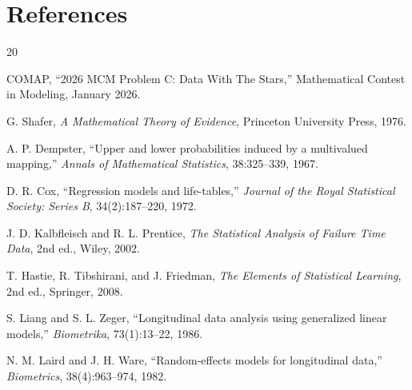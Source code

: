 \documentclass[10pt]{article}
\begin{document}
\section*{References}

\begin{thebibliography}{20}

 COMAP, ``2026 MCM Problem C: Data With The Stars,'' Mathematical
Contest in Modeling, January 2026.

 G. Shafer, \textit{A Mathematical Theory of Evidence}, Princeton
University Press, 1976.

 A. P. Dempster, ``Upper and lower probabilities induced by a
multivalued mapping,'' \textit{Annals of Mathematical Statistics}, 38:325--339, 1967.

 D. R. Cox, ``Regression models and life-tables,'' \textit{Journal of
the Royal Statistical Society: Series B}, 34(2):187--220, 1972.

 J. D. Kalbfleisch and R. L. Prentice, \textit{The Statistical
Analysis of Failure Time Data}, 2nd ed., Wiley, 2002.

 T. Hastie, R. Tibshirani, and J. Friedman, \textit{The Elements of
Statistical Learning}, 2nd ed., Springer, 2008.

 S. Liang and S. L. Zeger, ``Longitudinal data analysis using
generalized linear models,'' \textit{Biometrika}, 73(1):13--22, 1986.

 N. M. Laird and J. H. Ware, ``Random-effects models for
longitudinal data,'' \textit{Biometrics}, 38(4):963--974, 1982.

\end{thebibliography}


\end{document}
